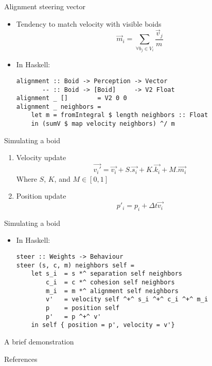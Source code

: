 \documentclass{beamer}
\begin{document}
\begin{frame}[fragile]
    \huge{Alignment steering vector}\normalsize
    \begin{itemize}
    \item Tendency to match velocity with visible boids
    \begin{equation*}
    \vec{m}_i = \sum\limits_{\forall b_j \in V_i} \frac{\vec{v}_j}{m}
    \end{equation*}
    \item<2-> In Haskell:
    \begin{verbatim}
alignment :: Boid -> Perception -> Vector
       -- :: Boid -> [Boid]     -> V2 Float
alignment _ []        = V2 0 0
alignment _ neighbors =
    let m = fromIntegral $ length neighbors :: Float
    in (sumV $ map velocity neighbors) ^/ m
    \end{verbatim}
    \end{itemize}
\end{frame}


\begin{frame}[fragile]
    \huge{Simulating a boid}\normalsize
    \begin{enumerate}
    \item<1-> Velocity update
    \begin{equation*}
    \vec{v_i\prime} = \vec{v_i} + S.\vec{s_i} + K.\vec{k_i} + M.\vec{m_i}
    \end{equation*}
        Where $S$, $K$, and $M \in [0,1]$
    \item<2-> Position update
    \begin{equation*}
    p\prime_i = p_i + \Delta t\vec{v_i}
    \end{equation*}
    \end{enumerate}
\end{frame}

\begin{frame}[fragile]
    \huge{Simulating a boid}\normalsize
    \begin{itemize}
    \item In Haskell:
        \begin{verbatim}
steer :: Weights -> Behaviour
steer (s, c, m) neighbors self =
    let s_i  = s *^ separation self neighbors
        c_i  = c *^ cohesion self neighbors
        m_i  = m *^ alignment self neighbors
        v'   = velocity self ^+^ s_i ^+^ c_i ^+^ m_i
        p    = position self
        p'   = p ^+^ v'
    in self { position = p', velocity = v'}
        \end{verbatim}
    \end{itemize}
\end{frame}

\begin{frame}
    \huge{A brief demonstration}\normalsize
\end{frame}

\renewcommand{\pgfuseimage}[1]{\texttt{[image: \#1]}}

\begin{frame}
\huge{References}\normalsize
\tiny{

 
 
}
\end{frame}
\end{document}
